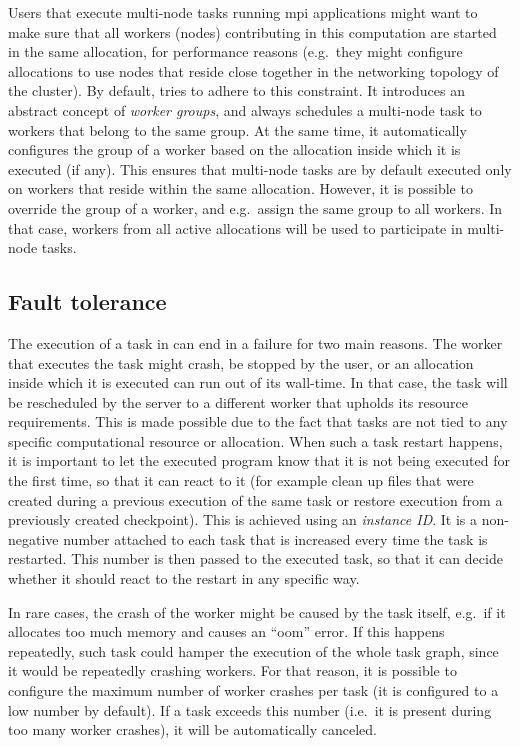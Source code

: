 Users that execute multi-node tasks running \gls{mpi} applications might want to make
sure that all workers (nodes) contributing in this computation are started in the same allocation,
for performance reasons (e.g.\ they might configure allocations to use nodes that reside close
together in the networking topology of the cluster). By default, \hyperqueue{} tries to
adhere to this constraint. It introduces an abstract concept of \emph{worker groups}, and always
schedules a multi-node task to workers that belong to the same group. At the same time, it
automatically configures the group of a worker based on the allocation inside which it is executed
(if any). This ensures that multi-node tasks are by default executed only on workers that reside
within the same allocation. However, it is possible to override the group of a worker, and e.g.\
assign the same group to all workers. In that case, workers from all active allocations will be
used to participate in multi-node tasks.

\subsection{Fault tolerance}
The execution of a task in \hyperqueue{} can end in a failure for two main reasons. The
worker that executes the task might crash, be stopped by the user, or an allocation inside which it
is executed can run out of its wall-time. In that case, the task will be rescheduled by the server
to a different worker that upholds its resource requirements. This is made possible due to the fact
that tasks are not tied to any specific computational resource or allocation. When such a task
restart happens, it is important to let the executed program know that it is not being executed for
the first time, so that it can react to it (for example clean up files that were created during a
previous execution of the same task or restore execution from a previously created checkpoint).
This is achieved using an \emph{instance ID}. It is a non-negative number attached to each
task that is increased every time the task is restarted. This number is then passed to the executed
task, so that it can decide whether it should react to the restart in any specific way.

In rare cases, the crash of the worker might be caused by the task itself, e.g.\ if it allocates
too much memory and causes an ``\gls{oom}'' error. If this happens repeatedly, such
task could hamper the execution of the whole task graph, since it would be repeatedly crashing
workers. For that reason, it is possible to configure the maximum number of worker crashes per task
(it is configured to a low number by default). If a task exceeds this number (i.e.\ it is present
during too many worker crashes), it will be automatically canceled.

